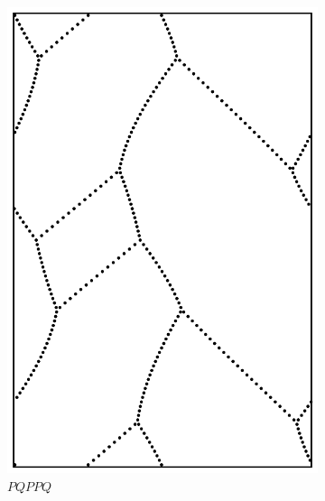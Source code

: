\documentclass[12pt,twoside]{reedthesis}
\theoremstyle{definition}
\begin{document}
\begin{figure}[b!]
\begin{subfigure}[t]{0.24\textwidth}
    \includegraphics[width=\textwidth]{figures/string_cheese_appendix/pqppq.pdf}
    \caption*{$PQPPQ$}
    \vspace{5mm}
  \end{subfigure}
  \hfill
  \begin{subfigure}[t]{0.24\textwidth}

\end{subfigure}
\end{figure}
\end{document}
